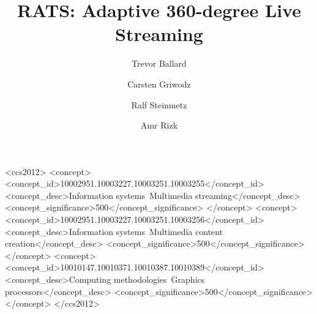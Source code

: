 \documentclass[sigconf]{acmart}
\begin{document}
\title{RATS: Adaptive 360-degree Live Streaming}

\author{Trevor Ballard}

\author{Carsten Griwodz}

\author{Ralf Steinmetz}

\author{Amr Rizk}


\begin{abstract}

\end{abstract}

%
%
 \begin{CCSXML}
	<ccs2012>
	<concept>
	<concept_id>10002951.10003227.10003251.10003255</concept_id>
	<concept_desc>Information systems~Multimedia streaming</concept_desc>
	<concept_significance>500</concept_significance>
	</concept>
	<concept>
	<concept_id>10002951.10003227.10003251.10003256</concept_id>
	<concept_desc>Information systems~Multimedia content creation</concept_desc>
	<concept_significance>500</concept_significance>
	</concept>
	<concept>
	<concept_id>10010147.10010371.10010387.10010389</concept_id>
	<concept_desc>Computing methodologies~Graphics processors</concept_desc>
	<concept_significance>500</concept_significance>
	</concept>
	</ccs2012>
\end{CCSXML}

%
%


\maketitle





\end{document}
